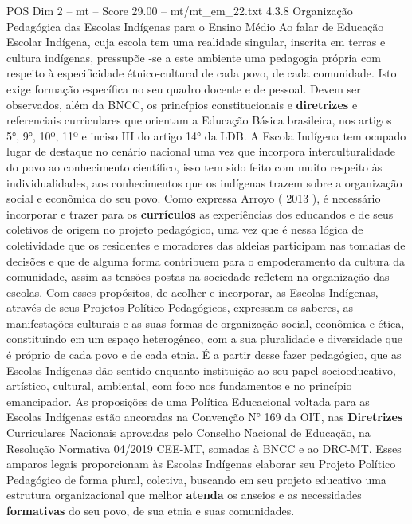 \begin{textsample}{POS Dim 2 – mt – Score 29.00 – mt/mt\_em\_22.txt}  \label{ex:f2_pos_224}
4.3.8 Organização Pedagógica das Escolas Indígenas para o Ensino Médio Ao falar de Educação Escolar Indígena, cuja escola tem uma realidade singular, inscrita em terras e cultura indígenas, pressupõe -se a este ambiente uma pedagogia própria com respeito à especificidade étnico-cultural de cada povo, de cada comunidade.
Isto exige formação específica no seu quadro docente e de pessoal.
Devem ser observados, além da BNCC, os princípios constitucionais e \textbf{diretrizes} e referenciais curriculares que orientam a Educação Básica brasileira, nos artigos 5{\EmojiFont °}, 9{\EmojiFont °}, 10º, 11º e inciso III do artigo 14{\EmojiFont °} da LDB.
A Escola Indígena tem ocupado lugar de destaque no cenário nacional uma vez que incorpora interculturalidade do povo ao conhecimento científico, isso tem sido feito com muito respeito às individualidades, aos conhecimentos que os indígenas trazem sobre a organização social e econômica do seu povo.
Como expressa Arroyo ( 2013 ), é necessário incorporar e trazer para os \textbf{currículos} as experiências dos educandos e de seus coletivos de origem no projeto pedagógico, uma vez que é nessa lógica de coletividade que os residentes e moradores das aldeias participam nas tomadas de decisões e que de alguma forma contribuem para o empoderamento da cultura da comunidade, assim as tensões postas na sociedade refletem na organização das escolas.
Com esses propósitos, de acolher e incorporar, as Escolas Indígenas, através de seus Projetos Político Pedagógicos, expressam os saberes, as manifestações culturais e as suas formas de organização social, econômica e ética, constituindo em um espaço heterogêneo, com a sua pluralidade e diversidade que é próprio de cada povo e de cada etnia.
É a partir desse fazer pedagógico, que as Escolas Indígenas dão sentido enquanto instituição ao seu papel socioeducativo, artístico, cultural, ambiental, com foco nos fundamentos e no princípio emancipador.
As proposições de uma Política Educacional voltada para as Escolas Indígenas estão ancoradas na Convenção N{\EmojiFont °} 169 da OIT, nas \textbf{Diretrizes} Curriculares Nacionais aprovadas pelo Conselho Nacional de Educação, na Resolução Normativa 04/2019 CEE-MT, somadas à BNCC e ao DRC-MT.
Esses amparos legais proporcionam às Escolas Indígenas elaborar seu Projeto Político Pedagógico de forma plural, coletiva, buscando em seu projeto educativo uma estrutura organizacional que melhor \textbf{atenda} os anseios e as necessidades \textbf{formativas} do seu povo, de sua etnia e suas comunidades.

\end{textsample}
